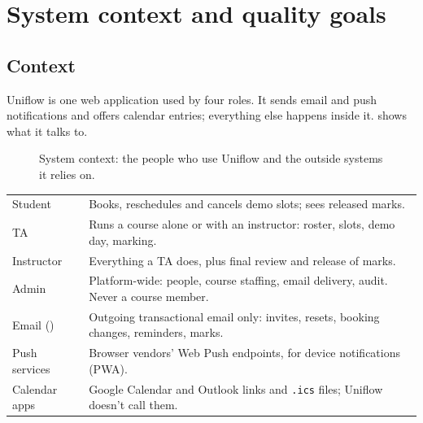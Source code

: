 \chapter{System context and quality goals}\label{ch:context}

\section{Context}
Uniflow is one web application used by four roles. It sends email and push notifications and
offers calendar entries; everything else happens inside it.  shows what it
talks to.

\begin{figure}[htbp]
  \centering
  
  \caption{System context: the people who use Uniflow and the outside systems it relies on.}
  \label{fig:context}
\end{figure}

\begin{xltabular}{\linewidth}{@{}P{32mm} L@{}}
  \toprule
   & \\
  \midrule
  Student & Books, reschedules and cancels demo slots; sees released marks.\\
  TA & Runs a course alone or with an instructor: roster, slots, demo day, marking.\\
  Instructor & Everything a TA does, plus final review and release of marks.\\
  Admin & Platform-wide: people, course staffing, email delivery, audit. Never a course member.\\
  Email () & Outgoing transactional email only: invites, resets, booking changes, reminders, marks.\\
  Push services & Browser vendors' Web Push endpoints, for device notifications (PWA).\\
  Calendar apps & Google Calendar and Outlook links and \texttt{.ics} files; Uniflow doesn't call them.\\
  \bottomrule
\end{xltabular}

